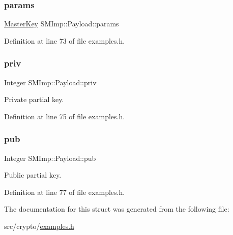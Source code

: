 \subsubsection{\texorpdfstring{params}{params}}
{\footnotesize\ttfamily \hyperlink{structSMImp_1_1MasterKey}{Master\+Key} S\+M\+Imp\+::\+Payload\+::params}



Definition at line 73 of file examples.\+h.

\mbox{\label{structSMImp_1_1Payload_ace83de4908d00be0927c1c5f60c5d15b}} 
\subsubsection{\texorpdfstring{priv}{priv}}
{\footnotesize\ttfamily Integer S\+M\+Imp\+::\+Payload\+::priv}



Private partial key. 



Definition at line 75 of file examples.\+h.

\mbox{\label{structSMImp_1_1Payload_a9e05bf883f696d21c610a13c2a495f1c}} 
\subsubsection{\texorpdfstring{pub}{pub}}
{\footnotesize\ttfamily Integer S\+M\+Imp\+::\+Payload\+::pub}



Public partial key. 



Definition at line 77 of file examples.\+h.



The documentation for this struct was generated from the following file\+:\begin{DoxyCompactItemize}
\item 
src/crypto/\hyperlink{examples_8h}{examples.\+h}\end{DoxyCompactItemize}
